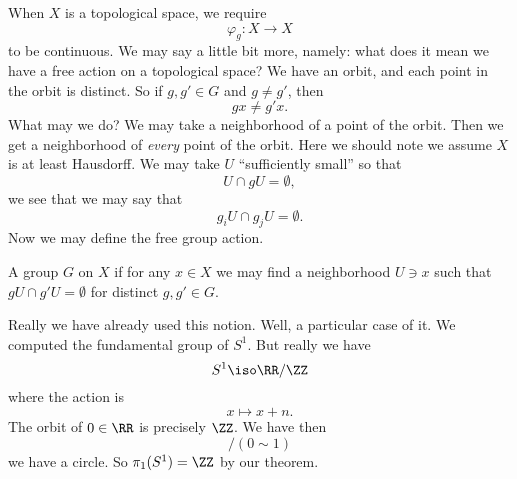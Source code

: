 When $X$ is a topological space, we require 
\begin{equation}
\varphi_{g}\colon X\to X
\end{equation}
to be continuous. We may say a little bit more, namely:
what does it mean we have a free action on a topological space? 
We have an orbit, and each point in the orbit is distinct. So if
$g,g'\in G$ and $g\not=g'$, then 
\begin{equation}
gx\not=g'x.
\end{equation}
What may we do? We may take a neighborhood of a point of the
orbit. Then we get a neighborhood of \emph{every} point of the
orbit. Here we should note we assume $X$ is at least
Hausdorff. We may take $U$ ``sufficiently small'' so that 
\begin{equation}
U\cap gU=\emptyset,
\end{equation}
we see that we may say that 
\begin{equation}
g_{i}U\cap g_{j}U=\emptyset.
\end{equation}
Now we may define the free group action.
\begin{defn}
A group $G$  on $X$ if for any $x\in X$ we
may find a neighborhood $U\ni x$ such that $g U\cap
g'U=\emptyset$ for distinct $g,g'\in G$.
\end{defn}
Really we have already used this notion. Well, a particular case
of it. We computed the fundamental group of $S^{1}$. But really
we have
\begin{equation}
S^{1}\iso\RR/\ZZ
\end{equation}
where the action is
\begin{equation}
x\mapsto x+n.
\end{equation}
The orbit of $0\in\RR$ is precisely $\ZZ$. We have then
\begin{equation*}
[0,1]/(0\sim1)
\end{equation*}
we have a circle. So $\pi_{1}(S^{1})=\ZZ$ by our theorem.

